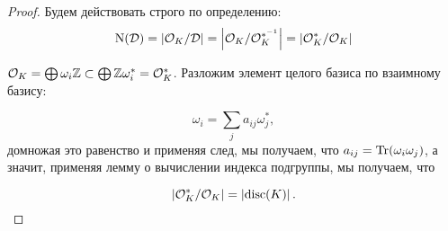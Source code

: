 	 \begin{proof}
	 	Будем действовать строго по определению: 
	 	\[
	 		\operatorname{\mathrm{N}}(\mathcal{D}) = \left\lvert \mathcal{O}_{K}/\mathcal{D} \right\rvert = \left\lvert \mathcal{O}_{K} / \mathcal{O}_{K}^{*^{-1}}\right\rvert = \left\lvert \mathcal{O}_{K}^{*}/\mathcal{O}_{K} \right\rvert
	 	\]

	 	$\mathcal{O}_{K} = \bigoplus \omega_i \mathbb{Z} \subset \bigoplus \mathbb{Z} \omega_i^{*} = \mathcal{O}_{K}^*$. Разложим элемент целого базиса по взаимному базису: 

	 	\[
	 		\omega_i = \sum_{j} a_{i j} \omega_j^*,
	 	\]
	 	домножая это равенство и применяя след, мы получаем, что $a_{i j} = \operatorname{Tr}(\omega_i \omega_j)$, а значит, применяя лемму о вычислении индекса подгруппы, мы получаем, что 

	 	\[
	 		\left\lvert \mathcal{O}_{K}^{*}/\mathcal{O}_{K} \right\rvert = \left\lvert \operatorname{disc}(K)\right\rvert. 
	 	\]
	 \end{proof}

